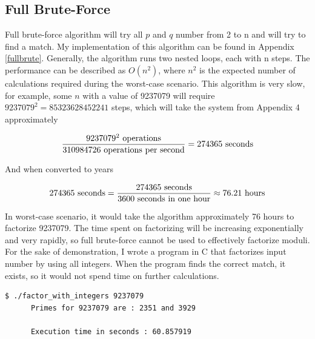 \documentclass[a4paper, 12pt]{article}
\begin{document}
\subsection{Full Brute-Force}
\label{bsec:full}

Full brute-force algorithm will try all $p$ and $q$ number from 2 to n and will try to find a match. My
implementation of this algorithm can be found in Appendix \ref{fullbrute}. Generally, the algorithm runs two
nested loops, each with n steps. The performance can be described as $O(n^2)$, where $n^2$ is the
expected number of calculations required during the worst-case scenario.
This algorithm is very slow, for example, some $n$ with a value of
9237079 will require $9237079^2 = 85323628452241$ steps, which will take the system from
Appendix 4 approximately

\begin{equation*}
  \frac{9237079^2 \text{ operations}}{ 310984726 \text{ operations per second}} = 274365 \text{ seconds}\\
  \end{equation*}

And when converted to years

\begin{equation*}
  274365 \text{ seconds}=\frac{274365 \text{ seconds}}{3600  \text{ seconds in one hour}} \approx 76.21 \text{ hours}\\
  \end{equation*}

In worst-case scenario, it would take the algorithm approximately 76 hours to factorize 9237079. The time spent on factorizing
will be increasing exponentially and very rapidly, so full brute-force cannot be used to effectively factorize
moduli.\\

For the sake of demonstration, I wrote a program in C that factorizes input number by using all integers. When the program
finds the correct match, it exists, so it would not spend time on further calculations.\cite{github}

\begin{center}
\begin{lstlisting}[caption=Demonstartion of Prime Factorization with Integers]
      $ ./factor_with_integers 9237079            
      Primes for 9237079 are : 2351 and 3929

      Execution time in seconds : 60.857919
  \end{lstlisting}
\end{center}
\end{document}
